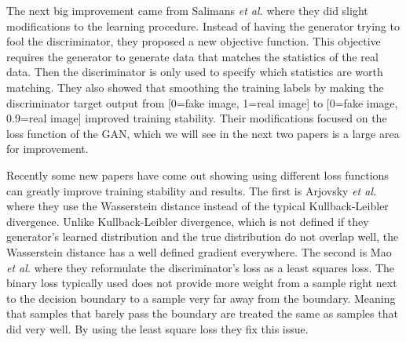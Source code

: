 The next big improvement came from Salimans \textit{et al.} \cite{salimans2016improved} where they did slight modifications to the learning procedure. Instead of having the generator trying to fool the discriminator, they proposed a new objective function. This objective requires the generator to generate data that matches the statistics of the real data. Then the discriminator is only used to specify which statistics are worth matching. They also showed that smoothing the training labels by making the discriminator target output from [0=fake image, 1=real image] to [0=fake image, 0.9=real image] improved training stability. Their modifications focused on the loss function of the GAN, which we will see in the next two papers is a large area for improvement.

Recently some new papers have come out showing using different loss functions can greatly improve training stability and results. The first is Arjovsky \textit{et al.} \cite{arjovsky2017wasserstein} where they use the Wasserstein distance instead of the typical Kullback-Leibler divergence. Unlike Kullback-Leibler divergence, which is not defined if they generator's learned distribution and the true distribution do not overlap well, the Wasserstein distance has a well defined gradient everywhere. The second is Mao \textit{et al.} \cite{mao2017lsgan} where they reformulate the discriminator's loss as a least squares loss. The binary loss typically used does not provide more weight from a sample right next to the decision boundary to a sample very far away from the boundary. Meaning that samples that barely pass the boundary are treated the same as samples that did very well. By using the least square loss they fix this issue.


